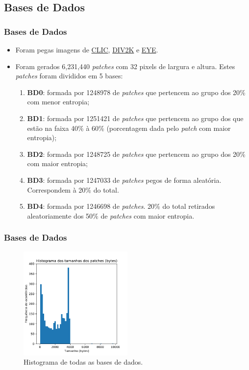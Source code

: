 \documentclass{beamer}
\begin{document}
\subsection{Bases de Dados}
\begin{frame}
\frametitle{Bases de Dados}
\begin{itemize}
\item Foram pegas imagens de \href{https://www.compression.cc/}{CLIC}, \href{https://data.vision.ee.ethz.ch/cvl/DIV2K/}{DIV2K} e \href{https://mmspg.epfl.ch/downloads/ultra-eye/}{EYE}.
\item Foram gerados 6,231,440 \textit{patches} com 32 pixels de largura e altura. Estes \textit{patches} foram divididos em 5 bases:
\begin{enumerate}
    \item \textbf{BD0}: formada por 1248978 de \textit{patches} que pertencem ao grupo dos 20\% com menor entropia;
    \item \textbf{BD1}: formada por 1251421 de \textit{patches} que pertencem ao grupo dos que estão na faixa 40\% à 60\% (porcentagem dada pelo \textit{patch} com maior entropia);
    \item \textbf{BD2}: formada por 1248725 de \textit{patches} que pertencem ao grupo dos 20\% com maior entropia;
    \item \textbf{BD3}: formada por 1247033 de \textit{patches} pegos de forma aleatória. Correspondem à 20\% do total.
    \item \textbf{BD4}: formada por 1246698 de \textit{patches}. 20\% do total retirados aleatoriamente dos 50\% de \textit{patches} com maior entropia.
\end{enumerate}
\end{itemize}
\end{frame}
\begin{frame}
\frametitle{Bases de Dados}
\begin{figure}
\includegraphics[width=0.5\textwidth]{figs/hist_all.pdf}
\caption{Histograma de todas as bases de dados.}
\end{figure}
\end{frame}
\end{document}
